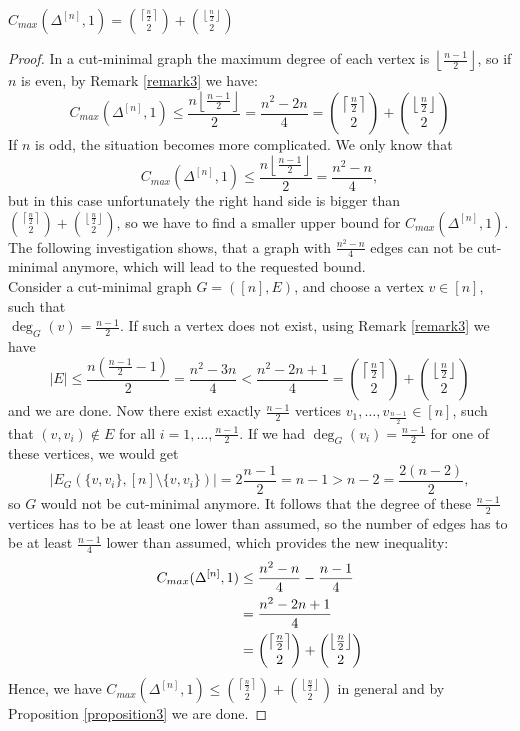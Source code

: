 \begin{thm}\label{theorem1}
\(C_{max}(\Delta^{[n]},1)=\binom{\left\lceil\frac{n}{2}\right\rceil}{2}+\binom{\left\lfloor\frac{n}{2}\right\rfloor}{2}\)
\begin{proof}
In a cut-minimal graph the maximum degree of each vertex is \(\left\lfloor\frac{n-1}{2}\right\rfloor\), so if \(n\) is even, by Remark \ref{remark3} we have:
\[
C_{max}(\Delta^{[n]},1)\leq\frac{n\left\lfloor\frac{n-1}{2}\right\rfloor}{2}=\frac{n^2-2n}{4}=\binom{\left\lceil\frac{n}{2}\right\rceil}{2}+\binom{\left\lfloor\frac{n}{2}\right\rfloor}{2}
\]
If \(n\) is odd, the situation becomes more complicated. We only know that
\[
C_{max}(\Delta^{[n]},1)\leq\frac{n\left\lfloor\frac{n-1}{2}\right\rfloor}{2}=\frac{n^2-n}{4},
\]
but in this case unfortunately the right hand side is bigger than \(\binom{\left\lceil\frac{n}{2}\right\rceil}{2}+\binom{\left\lfloor\frac{n}{2}\right\rfloor}{2}\), so we have to find a smaller upper bound for \(C_{max}(\Delta^{[n]},1)\). The following investigation shows, that a graph with \(\frac{n^2-n}{4}\) edges can not be cut-minimal anymore, which will lead to the requested bound.\\
Consider a cut-minimal graph \(G=([n],E)\), and choose a vertex \(v\in [n]\), such that\\
\(\deg_G(v)=\frac{n-1}{2}\). If such a vertex does not exist, using Remark \ref{remark3} we have
\[
|E|\leq\frac{n(\frac{n-1}{2}-1)}{2}=\frac{n^2-3n}{4}<\frac{n^2-2n+1}{4}=\binom{\left\lceil\frac{n}{2}\right\rceil}{2}+\binom{\left\lfloor\frac{n}{2}\right\rfloor}{2}
\]
and we are done. Now there exist exactly \(\frac{n-1}{2}\) vertices \(v_1,\ldots,v_{\frac{n-1}{2}}\in [n]\), such that \((v,v_i)\notin E\) for all \(i=1,\ldots,\frac{n-1}{2}\). If we had \(\deg_G(v_i)=\frac{n-1}{2}\) for one of these vertices, we would get
\[
|E_G(\{v,v_i\},[n]\setminus\{v,v_i\})|=2\frac{n-1}{2}=n-1>n-2=\frac{2(n-2)}{2},
\]
so \(G\) would not be cut-minimal anymore. It follows that the degree of these \(\frac{n-1}{2}\) vertices has to be at least one lower than assumed, so the number of edges has to be at least \(\frac{n-1}{4}\) lower than assumed, which provides the new inequality:
\begin{align}
C_{max}(\Delta^{[n]},1)&\leq\frac{n^2-n}{4}-\frac{n-1}{4}\notag\\
&=\frac{n^2-2n+1}{4}\notag\\
&=\binom{\left\lceil\frac{n}{2}\right\rceil}{2}+\binom{\left\lfloor\frac{n}{2}\right\rfloor}{2}\notag
\end{align}
Hence, we have \(C_{max}(\Delta^{[n]},1)\leq\binom{\left\lceil\frac{n}{2}\right\rceil}{2}+\binom{\left\lfloor\frac{n}{2}\right\rfloor}{2}\) in general and by Proposition \ref{proposition3} we are done.
\end{proof}
\end{thm}

